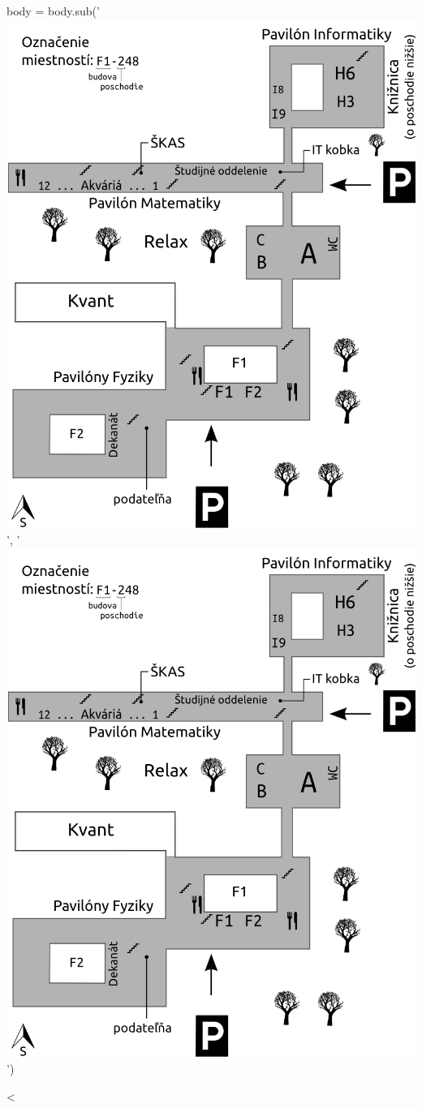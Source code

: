 \documentclass[11pt,slovak,twosides,openany]{scrbook}
\begin{document}
body = body.sub('\includegraphics{images/plan_matfyzu.png}', '\includegraphics[width=1\textwidth]{images/plan_matfyzu.png}')

<%
\end{document}
